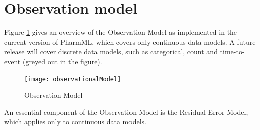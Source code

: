 \section{Observation model}
\label{sec:observationModel}
Figure \ref{fig:observModel} gives an overview of the Observation Model as implemented in the current version of PharmML, which covers only continuous data models. A future release will cover discrete data models, such as categorical, count and time-to-event (greyed out in the figure).
\begin{figure}[h!]
\centering
 \texttt{[image: observationalModel]}
\caption{Observation Model}
\label{fig:observModel}
\end{figure}
An essential component of the Observation Model is the Residual Error Model, which applies only to continuous data models.

